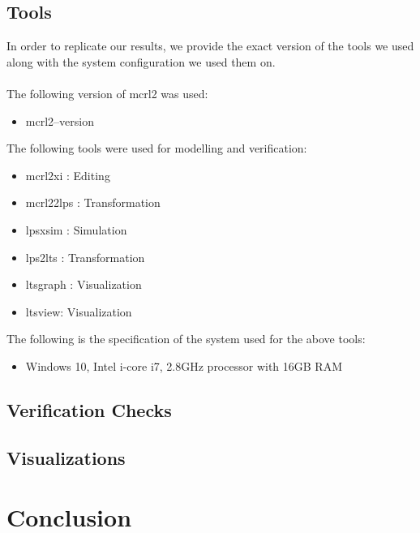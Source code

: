 \documentclass[a4paper,12pt]{article}
\begin{document}
\subsection{Tools}
In order to replicate our results, we provide the exact version of the tools we used along with the system configuration we used them on.
\\
\\The following version of mcrl2 was used:
\begin{itemize}
    \item mcrl2--version
\end{itemize}
The following tools were used for modelling and verification:
\begin{itemize}
    \item mcrl2xi : Editing
    \item mcrl22lps : Transformation
    \item lpsxsim : Simulation
    \item lps2lts : Transformation
    \item ltsgraph : Visualization
    \item ltsview: Visualization
\end{itemize}
The following is the specification of the system used for the above tools:
\begin{itemize}
    \item Windows 10, Intel i-core i7, 2.8GHz processor with 16GB RAM 
\end{itemize}
\subsection{Verification Checks}

\subsection{Visualizations}

\section{Conclusion}
\newpage
\appendix
\end{document}
